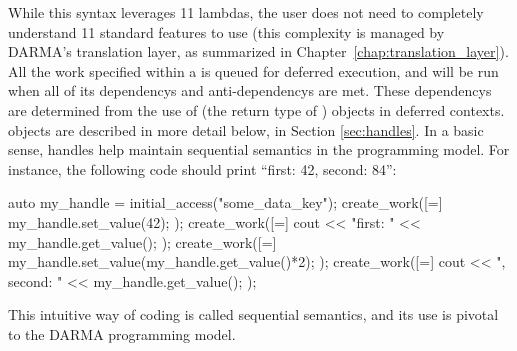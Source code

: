 While this syntax leverages \CC{}11 \glspl{lambda}, the user does not need to
completely understand \CC{}11 standard features to use 
(this complexity is managed by DARMA's \gls{translation layer}, as summarized in
Chapter~\ref{chap:translation_layer}). All the work specified within a
 is queued for deferred execution, and will be run when
all of its \glspl{dependency} and \glspl{anti-dependency} are met.  
These \glspl{dependency} are determined from the use of 
 (the return type of )
objects in \glspl{deferred context}.
 objects are described in more detail below, in
Section \ref{sec:handles}.  In a basic sense, \glspl{handle} help maintain
\gls{sequential semantics} in the \gls{programming model}.  For instance, the
following code should print ``first: 42, second: 84'':
\begin{CppCode}
auto my_handle = initial_access("some_data_key");
create_work([=]{
  my_handle.set_value(42);
});
create_work([=]{
  cout << "first: " << my_handle.get_value();
});
create_work([=]{
  my_handle.set_value(my_handle.get_value()*2);
});
create_work([=]{
  cout << ", second: " << my_handle.get_value();
});
\end{CppCode}
This intuitive way of coding is called \gls{sequential semantics}, 
and its use is pivotal to the DARMA \gls{programming model}.

%
%
%
%
%
%
%
%

